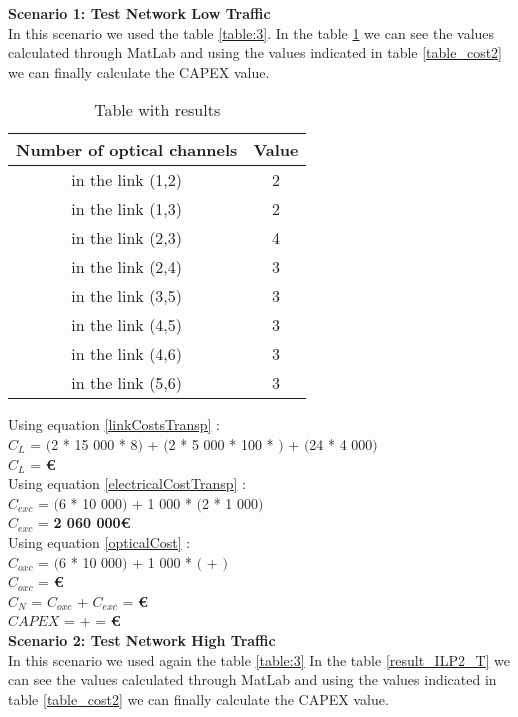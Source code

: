 \textbf{Scenario 1: Test Network Low Traffic} \label{Scenario1_transp} \\
In this scenario we used the table \ref{table:3}. In the table \ref{result_ILP1_T} we can see the values calculated through MatLab and using the values indicated in table \ref{table_cost2} we can finally calculate the CAPEX value. \\
\newpage
\begin{table}[h!]
\centering
\begin{tabular}{|| c | c||}
 \hline
 Number of optical channels & Value \\
 \hline\hline
 in the link (1,2) & 2 \\
 in the link (1,3) & 2 \\
 in the link (2,3) & 4 \\
 in the link (2,4) & 3 \\
 in the link (3,5) & 3 \\
 in the link (4,5) & 3 \\
 in the link (4,6) & 3 \\
 in the link (5,6) & 3 \\
 \hline
\end{tabular}
\caption{Table with results}
\label{result_ILP1_T}
\end{table}

Using equation \ref{linkCostsTransp} : \\
$C_L$ = $($2 * 15 000 * 8$)$ + $($2 * 5 000 * 100 * $)$ + $($24 * 4 000$)$ \\
$C_L$ = \textbf{ \euro} \\

Using equation \ref{electricalCostTransp} : \\
$C_{exc}$ = $($6 * 10 000$)$ + 1 000 * $($2 * 1 000$)$ \\
$C_{exc}$ = \textbf{2 060 000\euro} \\

Using equation \ref{opticalCost} : \\
$C_{oxc}$ = $($6 * 10 000$)$ + 1 000 * $($ + $)$ \\
$C_{oxc}$ = \textbf{ \euro} \\
$C_N$ = $C_{oxc}$ + $C_{exc}$ = \textbf{ \euro} \\

$CAPEX$ =  +  = \textbf{ \euro}\\

\textbf{Scenario 2: Test Network High Traffic} \label{Scenario2_transp} \\
In this scenario we used again the table \ref{table:3} In the table \ref{result_ILP2_T} we can see the values calculated through MatLab and using the values indicated in table \ref{table_cost2} we can finally calculate the CAPEX value.

